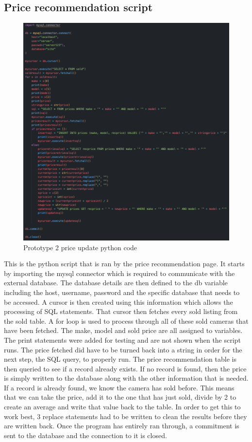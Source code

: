 \subsection{Price recommendation script}
\begin{figure}[H]
    \centering
    \includegraphics[scale=0.4]{ch3_developing/proto2/proto2_pricerec_alg.png}
    \caption{Prototype 2 price update python code}
    \label{fig:proto2_pricealg}
\end{figure}
This is the python script that is ran by the price recommendation page. It starts by importing the mysql connector which is required to communicate with the external database. The database details are then defined to the db variable including the host, username, password and the specific database that needs to be accessed. A cursor is then created using this information which allows the processing of SQL statements. That cursor then fetches every sold listing from the sold table. A for loop is used to process through all of these sold cameras that have been fetched. The make, model and sold price are all assigned to variables. The print statements were added for testing and are not shown when the script runs. The price fetched did have to be turned back into a string in order for the next step, the SQL query, to properly run. The price recommendation table is then queried to see if a record already exists. If no record is found, then the price is simply written to the database along with the other information that is needed. If a record is already found, we know the camera has sold before. This means that we can take the price, add it to the one that has just sold, divide by 2 to create an average and write that value back to the table. In order to get this to work best, 3 replace statements had to be written to clean the results before they are written back. Once the program has entirely ran through, a commitment is sent to the database and the connection to it is closed. 

